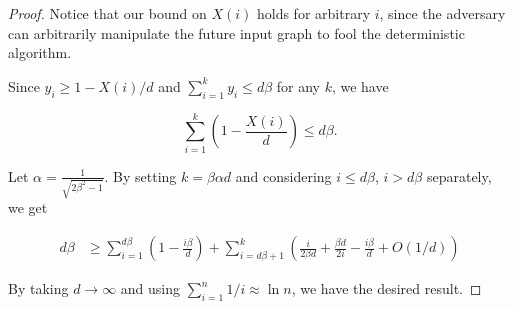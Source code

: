 \documentclass{article}
\begin{document}
\begin{proof}
Notice that our bound on $X(i)$ holds for arbitrary $i$, since the adversary can arbitrarily manipulate the future input graph to fool the deterministic algorithm.


Since $y_i\geq 1-X(i)/d$ and $\sum_{i=1}^k y_i \leq d\beta$ for any $k$, we have

\[
\sum_{i=1}^k \left(1-\frac{X(i)}{d}\right) \leq d\beta.
\]


Let $\alpha = \frac{1}{\sqrt{2\beta^2-1}}$. By setting $k = \beta \alpha d$ and considering $i\leq d\beta$, $i>d\beta$ separately,
we get

\begin{align}
d\beta &\geq \sum_{i=1}^{d\beta} \left(1-\frac{i\beta}{d}\right) +\sum_{i=d\beta +1}^k \left(\frac{i}{2\beta d}+\frac{\beta d}{2i}-\frac{i\beta}{d}+O(1/d)\right)\nonumber
\end{align}

%

By taking $d\longrightarrow\infty$ and using $\sum_{i=1}^n 1/i\approx \ln n$, we have the desired result.

%

\end{proof}


%
%
\end{document}
